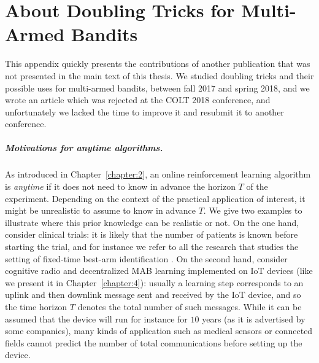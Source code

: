 \chapter{About Doubling Tricks for Multi-Armed Bandits}
\label{app:2:DoublingTricks}

This appendix quickly presents the contributions of another publication that was not presented in the main text of this thesis.
We studied doubling tricks and their possible uses for multi-armed bandits, between fall 2017 and spring 2018, and we wrote an article \cite{Besson2018DoublingTricks} which was rejected at the COLT 2018 conference, and unfortunately we lacked the time to improve it and resubmit it to another conference.




\paragraph{Motivations for anytime algorithms.}
%
As introduced in Chapter~\ref{chapter:2},
an online reinforcement learning algorithm is \emph{anytime} if it does not need to know in advance the horizon $T$ of the experiment.
%
Depending on the context of the practical application of interest, it might be unrealistic to assume to know in advance $T$. We give two examples to illustrate where this prior knowledge can be realistic or not.
On the one hand, consider clinical trials: it is likely that the number of patients is known before starting the trial, and for instance we refer to all the research that studies the setting of fixed-time best-arm identification \cite{audibert2010best,Garivier16BAI}.
On the second hand, consider cognitive radio and decentralized MAB learning implemented on IoT devices (like we present it in Chapter~\ref{chapter:4}): usually a learning step corresponds to an uplink and then downlink message sent and received by the IoT device, and so the time horizon $T$ denotes the total number of such messages. While it can be assumed that the device will run for instance for $10$ years (as it is advertised by some companies), many kinds of application such as medical sensors or connected fields cannot predict the number of total communications before setting up the device.

